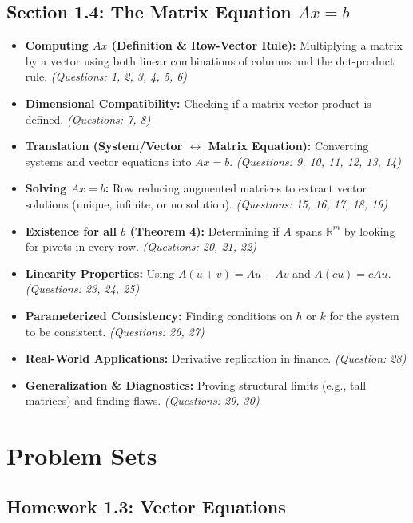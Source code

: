 \documentclass[12pt]{article}
\begin{document}
\subsection{Section 1.4: The Matrix Equation $Ax=b$}
\begin{itemize}
    \item \textbf{Computing $Ax$ (Definition \& Row-Vector Rule):} Multiplying a matrix by a vector using both linear combinations of columns and the dot-product rule. \textit{(Questions: 1, 2, 3, 4, 5, 6)}
    \item \textbf{Dimensional Compatibility:} Checking if a matrix-vector product is defined. \textit{(Questions: 7, 8)}
    \item \textbf{Translation (System/Vector $\leftrightarrow$ Matrix Equation):} Converting systems and vector equations into $Ax=b$. \textit{(Questions: 9, 10, 11, 12, 13, 14)}
    \item \textbf{Solving $Ax=b$:} Row reducing augmented matrices to extract vector solutions (unique, infinite, or no solution). \textit{(Questions: 15, 16, 17, 18, 19)}
    \item \textbf{Existence for all $b$ (Theorem 4):} Determining if $A$ spans $\mathbb{R}^m$ by looking for pivots in every row. \textit{(Questions: 20, 21, 22)}
    \item \textbf{Linearity Properties:} Using $A(u+v) = Au + Av$ and $A(cu) = cAu$. \textit{(Questions: 23, 24, 25)}
    \item \textbf{Parameterized Consistency:} Finding conditions on $h$ or $k$ for the system to be consistent. \textit{(Questions: 26, 27)}
    \item \textbf{Real-World Applications:} Derivative replication in finance. \textit{(Question: 28)}
    \item \textbf{Generalization \& Diagnostics:} Proving structural limits (e.g., tall matrices) and finding flaws. \textit{(Questions: 29, 30)}
\end{itemize}

\newpage

\section{Problem Sets}

\subsection{Homework 1.3: Vector Equations}
\end{document}
